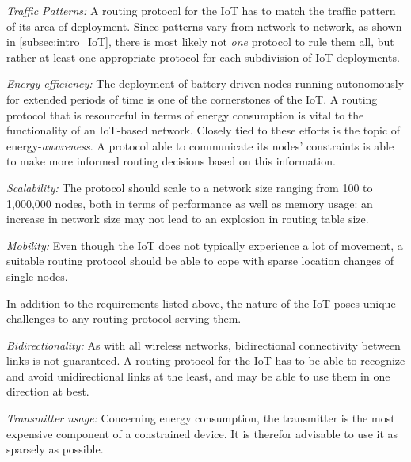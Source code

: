 \begin{description}
\item{\emph{Traffic Patterns:}} A routing protocol for the IoT has to match the traffic pattern of its area of deployment. Since patterns vary from network to network, as shown in \ref{subsec:intro_IoT}, there is most likely not \emph{one} protocol to rule them all, but rather at least one appropriate protocol for each subdivision of IoT deployments.

\item{\emph{Energy efficiency:}} The deployment of battery-driven nodes running autonomously for extended periods of time is one of the cornerstones of the IoT. A routing protocol that is resourceful in terms of energy consumption is vital to the functionality of an IoT-based network.
Closely tied to these efforts is the topic of energy-\emph{awareness}. A protocol able to communicate its nodes' constraints is able to make more informed routing decisions based on this information.

\item{\emph{Scalability:}} The protocol should scale to a network size ranging from 100 to 1,000,000 nodes, both in terms of performance as well as memory usage: an increase in network size may not lead to an explosion in routing table size.

\item{\emph{Mobility:}} Even though the \gls{IoT} does not typically experience a lot of movement, a suitable routing protocol should be able to cope with sparse location changes of single nodes.
\end{description}
In addition to the requirements listed above, the nature of the \gls{IoT} poses unique challenges to any routing protocol serving them.

\begin{description}
\item{\emph{Bidirectionality:}} As with all wireless networks, bidirectional connectivity between links is not guaranteed. %
A routing protocol for the \gls{IoT} has to be able to recognize and avoid unidirectional links at the least, and may be able to use them in one direction at best.

\item{\emph{Transmitter usage:}} Concerning energy consumption, the transmitter is the most expensive component of a constrained device.
It is therefor advisable to use it as sparsely as possible. %
\end{description}

